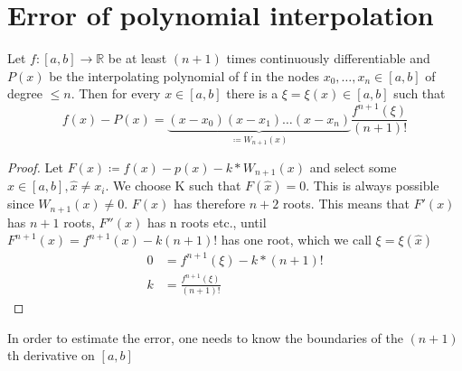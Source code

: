 \section{Error of polynomial interpolation}\label{sec:error-of-polynomial-interpolation}

\begin{theorem}
    Let $f:[a,b] \to \mathbb{R}$ be at least $(n+1)$ times continuously differentiable and $P(x)$ be the interpolating polynomial of f in the nodes
    $x_0, \ldots, x_n \in [a,b]$ of degree $\leq n$.
    Then for every $x \in [a,b]$ there is a $\xi = \xi(x) \in [a,b]$ such that
    \begin{equation*}
        f(x)-P(x) = \underbrace{(x-x_0)(x-x_1)\ldots(x-x_n)}_{\coloneqq W_{n+1}(x)}\frac{f^{n+1}(\xi)}{(n+1)!}
    \end{equation*}
\end{theorem}
\begin{proof}
    Let $F(x) \coloneqq f(x)-p(x)-k*W_{n+1}(x)$ and select some $\hat{x}\in [a,b], \hat{x} \neq x_i$.
    We choose K such that $F(\hat{x})=0$.
    This is always possible since $W_{n+1}(x) \neq 0$. $F(x)$ has therefore $n+2$ roots.
    This means that $F'(x)$ has $n+1$ roots, $F''(x)$ has n roots etc., until $F^{n+1}(x)= f^{n+1}(x)-k(n+1)!$ has one root,
    which we call $\xi = \xi(\hat{x})$
    \begin{align*}
        0 &= f^{n+1}(\xi)-k*(n+1)! \\
        k &= \frac{f^{n+1}(\xi)}{(n+1)!}
    \end{align*}
\end{proof}
\begin{remark}
    In order to estimate the error, one needs to know the boundaries of the $(n+1)$th derivative on $[a,b]$
\end{remark}


